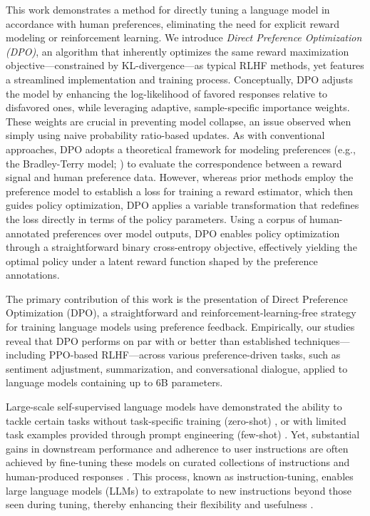 This work demonstrates a method for directly tuning a language model in accordance with human preferences, eliminating the need for explicit reward modeling or reinforcement learning. We introduce \textit{{Direct Preference Optimization} (DPO)}, an algorithm that inherently optimizes the same reward maximization objective—constrained by KL-divergence—as typical RLHF methods, yet features a streamlined implementation and training process. Conceptually, DPO adjusts the model by enhancing the log-likelihood of favored responses relative to disfavored ones, while leveraging adaptive, sample-specific importance weights. These weights are crucial in preventing model collapse, an issue observed when simply using naive probability ratio-based updates. As with conventional approaches, DPO adopts a theoretical framework for modeling preferences (e.g., the Bradley-Terry model; \cite{bradley1952rankanalysis}) to evaluate the correspondence between a reward signal and human preference data. However, whereas prior methods employ the preference model to establish a loss for training a reward estimator, which then guides policy optimization, DPO applies a variable transformation that redefines the loss directly in terms of the policy parameters. Using a corpus of human-annotated preferences over model outputs, DPO enables policy optimization through a straightforward binary cross-entropy objective, effectively yielding the optimal policy under a latent reward function shaped by the preference annotations.

The primary contribution of this work is the presentation of Direct Preference Optimization (DPO), a straightforward and reinforcement-learning-free strategy for training language models using preference feedback. Empirically, our studies reveal that DPO performs on par with or better than established techniques—including PPO-based RLHF—across various preference-driven tasks, such as sentiment adjustment, summarization, and conversational dialogue, applied to language models containing up to 6B parameters.

Large-scale self-supervised language models have demonstrated the ability to tackle certain tasks without task-specific training (zero-shot) \citep{radford2019language}, or with limited task examples provided through prompt engineering (few-shot) \citep{gpt3,megatron,chowdhery2022palm}. Yet, substantial gains in downstream performance and adherence to user instructions are often achieved by fine-tuning these models on curated collections of instructions and human-produced responses \citep{mishra-etal-2022-cross,sanh2022multitask,chung2022scaling,thoppilan2022lamda}. This process, known as instruction-tuning, enables large language models (LLMs) to extrapolate to new instructions beyond those seen during tuning, thereby enhancing their flexibility and usefulness \citep{chung2022scaling}. 

